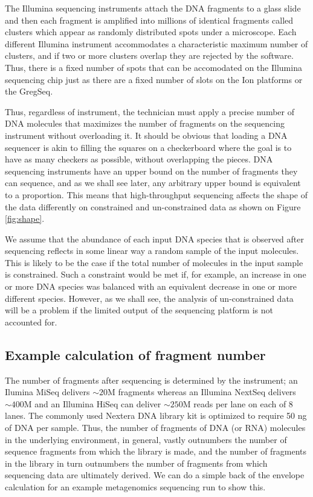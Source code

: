 \documentclass[onecolumn]{book}
\theoremstyle{definition}
\theoremstyle{definition}
\theoremstyle{definition}
\theoremstyle{remark}
\begin{document}
The Illumina sequencing instruments attach the DNA fragments to a glass
slide and then each fragment is amplified into millions of identical
fragments called clusters which appear as randomly distributed spots
under a microscope. Each different Illumina instrument accommodates a
characteristic maximum number of clusters, and if two or more clusters
overlap they are rejected by the software. Thus, there is a fixed number
of spots that can be accomodated on the Illumina sequencing chip just as
there are a fixed number of slots on the Ion platforms or the GregSeq.

Thus, regardless of instrument, the technician must apply a precise
number of DNA molecules that maximizes the number of fragments on the
sequencing instrument without overloading it. It should be obvious that
loading a DNA sequencer is akin to filling the squares on a checkerboard
where the goal is to have as many checkers as possible, without
overlapping the pieces. DNA sequencing instruments have an upper bound
on the number of fragments they can sequence, and as we shall see later,
any arbitrary upper bound is equivalent to a proportion. This means that
high-throughput sequencing affects the shape of the data differently on
constrained and un-constrained data as shown on Figure \ref{fig:shape}.

We assume that the abundance of each input DNA species that is observed
after sequencing reflects in some linear way a random sample of the
input molecules. This is likely to be the case if the total number of
molecules in the input sample is constrained. Such a constraint would be
met if, for example, an increase in one or more DNA species was balanced
with an equivalent decrease in one or more different species. However,
as we shall see, the analysis of un-constrained data will be a problem
if the limited output of the sequencing platform is not accounted for.

\hypertarget{example-calculation-of-fragment-number}{%
\subsection{Example calculation of fragment
number}\label{example-calculation-of-fragment-number}}

The number of fragments after sequencing is determined by the
instrument; an Ilumina MiSeq delivers \(\sim 20\)M fragments whereas an
Illumina NextSeq delivers \(\sim 400\)M and an Illumina HiSeq can
deliver \(\sim 250\)M reads per lane on each of 8 lanes. The commonly
used Nextera DNA library kit is optimized to require 50 ng of DNA per
sample. Thus, the number of fragments of DNA (or RNA) molecules in the
underlying environment, in general, vastly outnumbers the number of
sequence fragments from which the library is made, and the number of
fragments in the library in turn outnumbers the number of fragments from
which sequencing data are ultimately derived. We can do a simple back of
the envelope calculation for an example metagenomics sequencing run to
show this.
\end{document}
